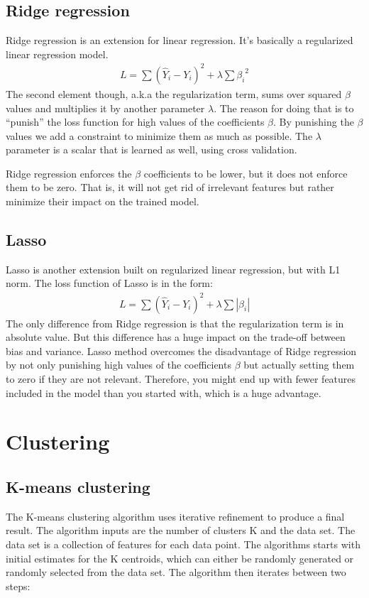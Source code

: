 \documentclass{book}
\begin{document}
\section{Ridge regression}
Ridge regression is an extension for linear regression. It's basically a regularized linear regression model. 
\begin{align*}
L = \sum (\hat{Y}_i - Y_i)^2 + \lambda \sum {\beta_i}^2 
\end{align*}
The second element though, a.k.a the regularization term, sums over squared $\beta$ values and multiplies it by another parameter $\lambda$. The reason for doing that is to ``punish'' the loss function for high values of the coefficients $\beta$. By punishing the $\beta$ values we add a constraint to minimize them as much as possible.
The $\lambda$ parameter is a scalar that is learned as well, using cross validation.

Ridge regression enforces the $\beta$ coefficients to be lower, but it does not enforce them to be zero. That is, it will not get rid of irrelevant features but rather minimize their impact on the trained model.

\section{Lasso}
Lasso is another extension built on regularized linear regression, but with L1 norm. The loss function of Lasso is in the form:
\begin{align*}
L = \sum (\hat{Y}_i - Y_i)^2 + \lambda \sum |{\beta_i}| 
\end{align*}
The only difference from Ridge regression is that the regularization term is in absolute value. But this difference has a huge impact on the trade-off between bias and variance. Lasso method overcomes the disadvantage of Ridge regression by not only punishing high values of the coefficients $\beta$ but actually setting them to zero if they are not relevant. Therefore, you might end up with fewer features included in the model than you started with, which is a huge advantage.

\chapter{Clustering}

\section{K-means clustering}
The K-means clustering algorithm uses iterative refinement to produce a final result. The algorithm inputs are the number of clusters K and the data set. The data set is a collection of features for each data point. The algorithms starts with initial estimates for the K centroids, which can either be randomly generated or randomly selected from the data set. The algorithm then iterates between two steps:
\end{document}
